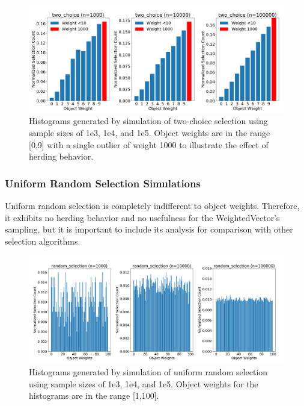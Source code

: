 \documentclass[12pt]{article}
\begin{document}
    \begin{figure}[h]
      \centering
      \includegraphics[scale=0.30]{images/pathological_two_choice.png} 
      \caption{Histograms generated by simulation of two-choice selection
               using sample sizes of 1e3, 1e4, and 1e5. Object weights are in
               the range [0,9] with a single outlier of weight 1000 to
               illustrate the effect of herding behavior.}
      \label{fig:pathological_two_choice}
    \end{figure}

    \subsubsection{Uniform Random Selection Simulations}
    Uniform random selection is completely indifferent to object weights.
    Therefore, it exhibits no herding behavior and no usefulness for the
    WeightedVector's sampling, but it is important to include its analysis for
    comparison with other selection algorithms.

    \begin{figure}[h]
      \centering
      \includegraphics[scale=0.30]{images/herding_random.png} 
      \caption{Histograms generated by simulation of uniform random selection
               using sample sizes of 1e3, 1e4, and 1e5. Object weights
               for the histograms are in the range [1,100].}
      \label{fig:herding_random}
    \end{figure}
\end{document}

